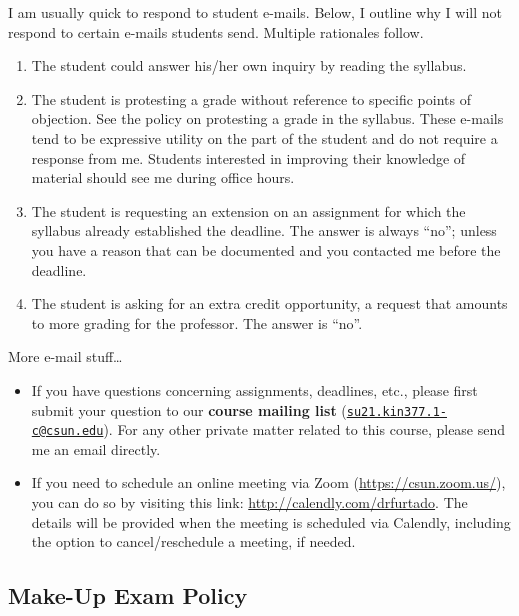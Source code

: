 \documentclass[11pt,]{article}
\providecommand{\tightlist}{%
  \setlength{\itemsep}{0pt}\setlength{\parskip}{0pt}}
\begin{document}
I am usually quick to respond to student e-mails. Below, I outline why I
will not respond to certain e-mails students send. Multiple rationales
follow.

\begin{enumerate}
\def\labelenumi{\arabic{enumi}.}
\tightlist
\item
  The student could answer his/her own inquiry by reading the syllabus.
\item
  The student is protesting a grade without reference to specific points
  of objection. See the policy on protesting a grade in the syllabus.
  These e-mails tend to be expressive utility on the part of the student
  and do not require a response from me. Students interested in
  improving their knowledge of material should see me during office
  hours.
\item
  The student is requesting an extension on an assignment for which the
  syllabus already established the deadline. The answer is always
  ``no''; unless you have a reason that can be documented and you
  contacted me before the deadline.
\item
  The student is asking for an extra credit opportunity, a request that
  amounts to more grading for the professor. The answer is ``no''.
\end{enumerate}

More e-mail stuff\ldots{}

\begin{itemize}
\item
  If you have questions concerning assignments, deadlines, etc., please
  first submit your question to our \textbf{course mailing list}
  (\href{mailto:su21.kin377.1-c@csun.edu}{\nolinkurl{su21.kin377.1-c@csun.edu}}).
  For any other private matter related to this course, please send me an
  email directly.
\item
  If you need to schedule an online meeting via Zoom
  (\url{https://csun.zoom.us/}), you can do so by visiting this link:
  \url{http://calendly.com/drfurtado}. The details will be provided when
  the meeting is scheduled via Calendly, including the option to
  cancel/reschedule a meeting, if needed.
\end{itemize}

\hypertarget{make-up-exam-policy}{%
\subsection{Make-Up Exam Policy}\label{make-up-exam-policy}}
\end{document}
